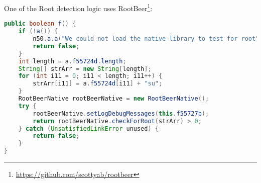One of the Root detection logic uses RootBeer\footnote{\url{https://github.com/scottyab/rootbeer}}:
\begin{lstlisting}[language=java]
public boolean f() {
    if (!a()) {
        n50.a.a("We could not load the native library to test for root");
        return false;
    }
    int length = a.f55724d.length;
    String[] strArr = new String[length];
    for (int i11 = 0; i11 < length; i11++) {
        strArr[i11] = a.f55724d[i11] + "su";
    }
    RootBeerNative rootBeerNative = new RootBeerNative();
    try {
        rootBeerNative.setLogDebugMessages(this.f55727b);
        return rootBeerNative.checkForRoot(strArr) > 0;
    } catch (UnsatisfiedLinkError unused) {
        return false;
    }
}
\end{lstlisting}





